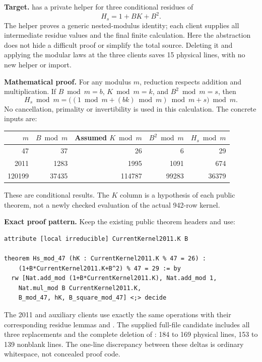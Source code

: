 \textbf{Target.}  has a private helper  for three conditional residues of
\[
 H_s=1+BK+B^2.
\]
The helper proves a generic nested-modulus identity; each client supplies all intermediate residue values and the final finite calculation. Here the abstraction does not hide a difficult proof or simplify the total source. Deleting it and applying the modular laws at the three clients saves 15 physical lines, with no new helper or import.

\textbf{Mathematical proof.} For any modulus \(m\), reduction respects addition and multiplication. If \(B\bmod m=b\), \(K\bmod m=k\), and \(B^2\bmod m=s\), then
\[
 H_s\bmod m
 =\bigl((1\bmod m+(bk)\bmod m)\bmod m+s\bigr)\bmod m.
\]
No cancellation, primality or invertibility is used in this calculation. The concrete inputs are:
\begin{center}
\begin{tabular}{rrrrr}\toprule
$m$ & $B\bmod m$ & Assumed $K\bmod m$ & $B^2\bmod m$ & $H_s\bmod m$\\\midrule
47 & 37 & 26 & 6 & 29\\
2011 & 1283 & 1995 & 1091 & 674\\
120199 & 37435 & 114787 & 99283 & 36379\\\bottomrule
\end{tabular}
\end{center}
These are conditional results. The \(K\) column is a hypothesis of each public theorem, not a newly checked evaluation of the actual 942-row kernel.

\textbf{Exact proof pattern.} Keep the existing public theorem headers and use:
\begin{lstlisting}
attribute [local irreducible] CurrentKernel2011.K B

theorem Hs_mod_47 (hK : CurrentKernel2011.K % 47 = 26) :
    (1+B*CurrentKernel2011.K+B^2) % 47 = 29 := by
  rw [Nat.add_mod (1+B*CurrentKernel2011.K), Nat.add_mod 1,
    Nat.mul_mod B CurrentKernel2011.K,
    B_mod_47, hK, B_square_mod_47] <;> decide
\end{lstlisting}
The 2011 and auxiliary clients use exactly the same operations with their corresponding residue lemmas and . The supplied full-file candidate includes all three replacements and the complete deletion of : 184 to 169 physical lines, 153 to 139 nonblank lines. The one-line discrepancy between these deltas is ordinary whitespace, not concealed proof code.

